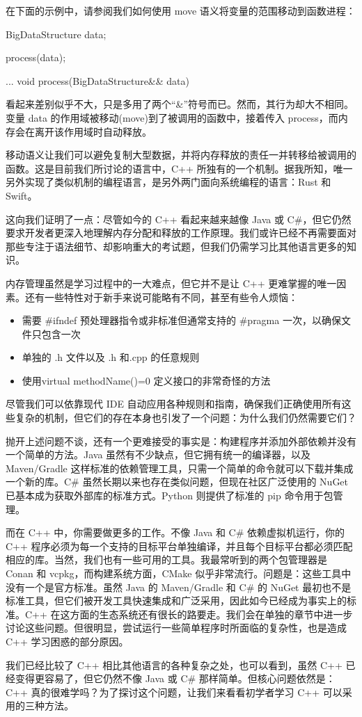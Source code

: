 在下面的示例中，请参阅我们如何使用 move 语义将变量的范围移动到函数进程：

\begin{cpp}
BigDataStructure data{};

process(data);

...
void process(BigDataStructure&& data){
}
\end{cpp}

看起来差别似乎不大，只是多用了两个“\&”符号而已。然而，其行为却大不相同。变量 data 的作用域被移动(move)到了被调用的函数中，接着传入 process，而内存会在离开该作用域时自动释放。

移动语义让我们可以避免复制大型数据，并将内存释放的责任一并转移给被调用的函数。这是目前我们所讨论的语言中，C++ 所独有的一个机制。据我所知，唯一另外实现了类似机制的编程语言，是另外两门面向系统编程的语言：Rust 和 Swift。

这向我们证明了一点：尽管如今的 C++ 看起来越来越像 Java 或 C\#，但它仍然要求开发者更深入地理解内存分配和释放的工作原理。我们或许已经不再需要面对那些专注于语法细节、却影响重大的考试题，但我们仍需学习比其他语言更多的知识。

内存管理虽然是学习过程中的一大难点，但它并不是让 C++ 更难掌握的唯一因素。还有一些特性对于新手来说可能略有不同，甚至有些令人烦恼：

\begin{itemize}
\item 
需要 \#ifndef 预处理器指令或非标准但通常支持的 \#pragma 一次，以确保文件只包含一次

\item 单独的 .h 文件以及 .h 和.cpp 的任意规则
\item 使用virtual methodName()=0 定义接口的非常奇怪的方法
\end{itemize}

尽管我们可以依靠现代 IDE 自动应用各种规则和指南，确保我们正确使用所有这些复杂的机制，但它们的存在本身也引发了一个问题：为什么我们仍然需要它们？

抛开上述问题不谈，还有一个更难接受的事实是：构建程序并添加外部依赖并没有一个简单的方法。Java 虽然有不少缺点，但它拥有统一的编译器，以及 Maven/Gradle 这样标准的依赖管理工具，只需一个简单的命令就可以下载并集成一个新的库。C\# 虽然长期以来也存在类似问题，但现在社区广泛使用的 NuGet 已基本成为获取外部库的标准方式。Python 则提供了标准的 pip 命令用于包管理。

而在 C++ 中，你需要做更多的工作。不像 Java 和 C\# 依赖虚拟机运行，你的 C++ 程序必须为每一个支持的目标平台单独编译，并且每个目标平台都必须匹配相应的库。当然，我们也有一些可用的工具。我最常听到的两个包管理器是 Conan 和 vcpkg，而构建系统方面，CMake 似乎非常流行。问题是：这些工具中没有一个是官方标准。虽然 Java 的 Maven/Gradle 和 C\# 的 NuGet 最初也不是标准工具，但它们被开发工具快速集成和广泛采用，因此如今已经成为事实上的标准。C++ 在这方面的生态系统还有很长的路要走。我们会在单独的章节中进一步讨论这些问题。但很明显，尝试运行一些简单程序时所面临的复杂性，也是造成 C++ 学习困惑的部分原因。

我们已经比较了 C++ 相比其他语言的各种复杂之处，也可以看到，虽然 C++ 已经变得更容易了，但它仍然不像 Java 或 C\# 那样简单。但核心问题依然是：C++ 真的很难学吗？为了探讨这个问题，让我们来看看初学者学习 C++ 可以采用的三种方法。


